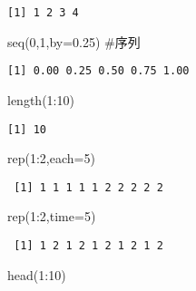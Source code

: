 \documentclass[
  letterpaper,
  DIV=11,
  numbers=noendperiod]{scrreprt}
\newenvironment{Shaded}{\begin{snugshade}}{\end{snugshade}}
\newcommand{\AttributeTok}[1]{\textcolor[rgb]{0.40,0.45,0.13}{#1}}
\newcommand{\CommentTok}[1]{\textcolor[rgb]{0.37,0.37,0.37}{#1}}
\newcommand{\DecValTok}[1]{\textcolor[rgb]{0.68,0.00,0.00}{#1}}
\newcommand{\FloatTok}[1]{\textcolor[rgb]{0.68,0.00,0.00}{#1}}
\newcommand{\FunctionTok}[1]{\textcolor[rgb]{0.28,0.35,0.67}{#1}}
\newcommand{\NormalTok}[1]{\textcolor[rgb]{0.00,0.23,0.31}{#1}}
\newcommand{\SpecialCharTok}[1]{\textcolor[rgb]{0.37,0.37,0.37}{#1}}
\begin{document}
\begin{verbatim}
[1] 1 2 3 4
\end{verbatim}

\begin{Shaded}
\begin{Highlighting}[]
\FunctionTok{seq}\NormalTok{(}\DecValTok{0}\NormalTok{,}\DecValTok{1}\NormalTok{,}\AttributeTok{by=}\FloatTok{0.25}\NormalTok{) }\CommentTok{\#序列}
\end{Highlighting}
\end{Shaded}

\begin{verbatim}
[1] 0.00 0.25 0.50 0.75 1.00
\end{verbatim}

\begin{Shaded}
\begin{Highlighting}[]
\FunctionTok{length}\NormalTok{(}\DecValTok{1}\SpecialCharTok{:}\DecValTok{10}\NormalTok{)}
\end{Highlighting}
\end{Shaded}

\begin{verbatim}
[1] 10
\end{verbatim}

\begin{Shaded}
\begin{Highlighting}[]
\FunctionTok{rep}\NormalTok{(}\DecValTok{1}\SpecialCharTok{:}\DecValTok{2}\NormalTok{,}\AttributeTok{each=}\DecValTok{5}\NormalTok{)}
\end{Highlighting}
\end{Shaded}

\begin{verbatim}
 [1] 1 1 1 1 1 2 2 2 2 2
\end{verbatim}

\begin{Shaded}
\begin{Highlighting}[]
\FunctionTok{rep}\NormalTok{(}\DecValTok{1}\SpecialCharTok{:}\DecValTok{2}\NormalTok{,}\AttributeTok{time=}\DecValTok{5}\NormalTok{)}
\end{Highlighting}
\end{Shaded}

\begin{verbatim}
 [1] 1 2 1 2 1 2 1 2 1 2
\end{verbatim}

\begin{Shaded}
\begin{Highlighting}[]
\FunctionTok{head}\NormalTok{(}\DecValTok{1}\SpecialCharTok{:}\DecValTok{10}\NormalTok{)}
\end{Highlighting}
\end{Shaded}
\end{document}
